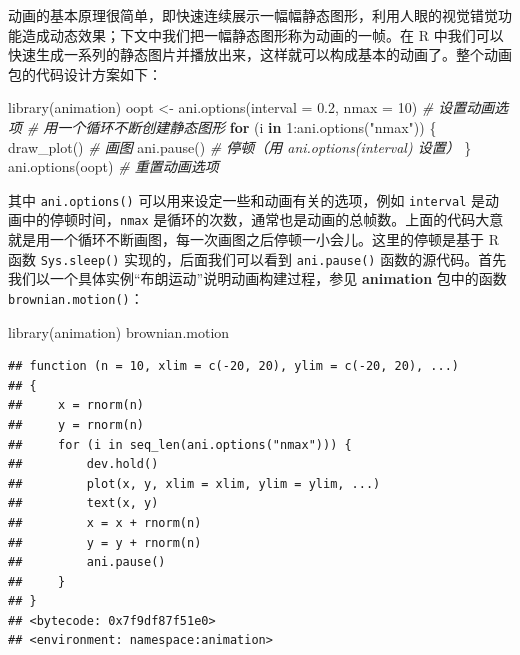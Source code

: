 \documentclass[
  b5paper,
  UTF8,twoside]{book}
\newenvironment{Shaded}{\begin{snugshade}}{\end{snugshade}}
\newcommand{\AttributeTok}[1]{\textcolor[rgb]{0.77,0.63,0.00}{#1}}
\newcommand{\CommentTok}[1]{\textcolor[rgb]{0.56,0.35,0.01}{\textit{#1}}}
\newcommand{\ControlFlowTok}[1]{\textcolor[rgb]{0.13,0.29,0.53}{\textbf{#1}}}
\newcommand{\DecValTok}[1]{\textcolor[rgb]{0.00,0.00,0.81}{#1}}
\newcommand{\FloatTok}[1]{\textcolor[rgb]{0.00,0.00,0.81}{#1}}
\newcommand{\FunctionTok}[1]{\textcolor[rgb]{0.00,0.00,0.00}{#1}}
\newcommand{\NormalTok}[1]{#1}
\newcommand{\OtherTok}[1]{\textcolor[rgb]{0.56,0.35,0.01}{#1}}
\newcommand{\SpecialCharTok}[1]{\textcolor[rgb]{0.00,0.00,0.00}{#1}}
\newcommand{\StringTok}[1]{\textcolor[rgb]{0.31,0.60,0.02}{#1}}
\begin{document}
动画的基本原理很简单，即快速连续展示一幅幅静态图形，利用人眼的视觉错觉功能造成动态效果；下文中我们把一幅静态图形称为动画的一帧。在 R 中我们可以快速生成一系列的静态图片并播放出来，这样就可以构成基本的动画了。整个动画包的代码设计方案如下：

\begin{Shaded}
\begin{Highlighting}[]
\FunctionTok{library}\NormalTok{(animation)}
\NormalTok{oopt }\OtherTok{\textless{}{-}} \FunctionTok{ani.options}\NormalTok{(}\AttributeTok{interval =} \FloatTok{0.2}\NormalTok{, }\AttributeTok{nmax =} \DecValTok{10}\NormalTok{) }\CommentTok{\# 设置动画选项}
\CommentTok{\# 用一个循环不断创建静态图形}
\ControlFlowTok{for}\NormalTok{ (i }\ControlFlowTok{in} \DecValTok{1}\SpecialCharTok{:}\FunctionTok{ani.options}\NormalTok{(}\StringTok{"nmax"}\NormalTok{)) \{}
  \FunctionTok{draw\_plot}\NormalTok{() }\CommentTok{\# 画图}
  \FunctionTok{ani.pause}\NormalTok{() }\CommentTok{\# 停顿（用 ani.options(\textquotesingle{}interval\textquotesingle{}) 设置）}
\NormalTok{\}}
\FunctionTok{ani.options}\NormalTok{(oopt) }\CommentTok{\# 重置动画选项}
\end{Highlighting}
\end{Shaded}

其中 \texttt{ani.options()} 可以用来设定一些和动画有关的选项，例如 \texttt{interval} 是动画中的停顿时间，\texttt{nmax} 是循环的次数，通常也是动画的总帧数。上面的代码大意就是用一个循环不断画图，每一次画图之后停顿一小会儿。这里的停顿是基于 R 函数 \texttt{Sys.sleep()} 实现的，后面我们可以看到 \texttt{ani.pause()} 函数的源代码。首先我们以一个具体实例``布朗运动''说明动画构建过程，参见 \textbf{animation} 包中的函数 \texttt{brownian.motion()}：

\begin{Shaded}
\begin{Highlighting}[]
\FunctionTok{library}\NormalTok{(animation)}
\NormalTok{brownian.motion}
\end{Highlighting}
\end{Shaded}

\begin{verbatim}
## function (n = 10, xlim = c(-20, 20), ylim = c(-20, 20), ...) 
## {
##     x = rnorm(n)
##     y = rnorm(n)
##     for (i in seq_len(ani.options("nmax"))) {
##         dev.hold()
##         plot(x, y, xlim = xlim, ylim = ylim, ...)
##         text(x, y)
##         x = x + rnorm(n)
##         y = y + rnorm(n)
##         ani.pause()
##     }
## }
## <bytecode: 0x7f9df87f51e0>
## <environment: namespace:animation>
\end{verbatim}
\end{document}
